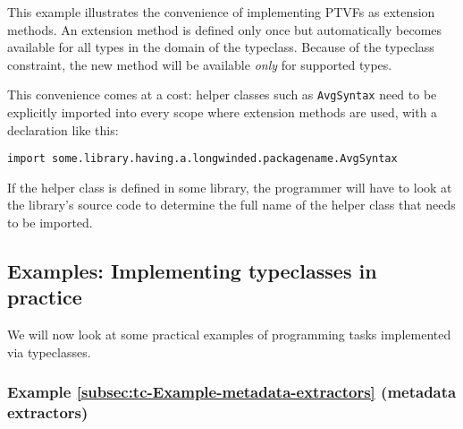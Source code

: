 This example illustrates the convenience of implementing PTVFs as
extension methods. An extension method is defined only once but automatically
becomes available for all types in the domain of the typeclass. Because
of the typeclass constraint, the new method will be available \emph{only}
for supported types.

This convenience comes at a cost: helper classes such as \lstinline!AvgSyntax!
need to be explicitly imported into every scope where extension methods
are used, with a declaration like this:
\begin{lstlisting}
import some.library.having.a.longwinded.packagename.AvgSyntax
\end{lstlisting}
If the helper class is defined in some library, the programmer will
have to look at the library\textsf{'}s source code to determine the full name
of the helper class that needs to be imported.

\subsection{Examples: Implementing typeclasses in practice}

We will now look at some practical examples of programming tasks implemented
via typeclasses.

\subsubsection{Example \label{subsec:tc-Example-metadata-extractors}\ref{subsec:tc-Example-metadata-extractors}
(metadata extractors)}

